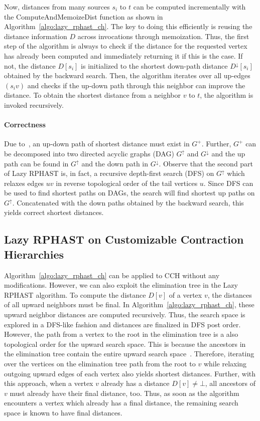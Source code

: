 \documentclass[manuscript,review]{acmart}
\newcommand*{\gchu}{G^{\uparrow}}
\newcommand*{\gchd}{G^{\downarrow}}
\begin{document}
Now, distances from many sources $s_i$ to $t$ can be computed incrementally with the \textsf{ComputeAndMemoizeDist} function as shown in Algorithm~\ref{algo:lazy_rphast_ch}.
The key to doing this efficiently is reusing the distance information $D$ across invocations through memoization.
Thus, the first step of the algorithm is always to check if the distance for the requested vertex has already been computed and immediately returning it if this is the case.
If not, the distance $D[s_i]$ is initialized to the shortest down-path distance $D^{\downarrow}[s_i]$ obtained by the backward search.
Then, the algorithm iterates over all up-edges $(s_i v)$ and checks if the up-down path through this neighbor can improve the distance.
To obtain the shortest distance from a neighbor $v$ to $t$, the algorithm is invoked recursively.

\paragraph{Correctness}
Due to~\cite{gssv-erlrn-12}, an up-down path of shortest distance must exist in $G^+$.
Further, $G^+$ can be decomposed into two directed acyclic graphs (DAG) $\gchu$ and $\gchd$ and the up path can be found in $\gchu$ and the down path in $\gchd$.
Observe that the second part of Lazy RPHAST is, in fact, a recursive depth-first search (DFS) on $\gchu$ which relaxes edges $uv$ in reverse topological order of the tail vertices $u$.
Since DFS can be used to find shortest paths on DAGs, the search will find shortest up paths on $\gchu$.
Concatenated with the down paths obtained by the backward search, this yields correct shortest distances.

\subsection{Lazy RPHAST on Customizable Contraction Hierarchies}

Algorithm~\ref{algo:lazy_rphast_ch} can be applied to CCH without any modifications.
However, we can also exploit the elimination tree in the Lazy RPHAST algorithm.
To compute the distance $D[v]$ of a vertex $v$, the distances of all upward neighbors must be final.
In Algorithm~\ref{algo:lazy_rphast_ch}, these upward neighbor distances are computed recursively.
Thus, the search space is explored in a DFS-like fashion and distances are finalized in DFS post order.
However, the path from a vertex to the root in the elimination tree is a also topological order for the upward search space.
This is because the ancestors in the elimination tree contain the entire upward search space~\cite{bcrw-s-16}.
Therefore, iterating over the vertices on the elimination tree path from the root to $v$ while relaxing outgoing upward edges of each vertex also yields shortest distances.
Further, with this approach, when a vertex $v$ already has a distance $D[v] \neq \bot$, all ancestors of $v$ must already have their final distance, too.
Thus, as soon as the algorithm encounters a vertex which already has a final distance, the remaining search space is known to have final distances.
\end{document}
